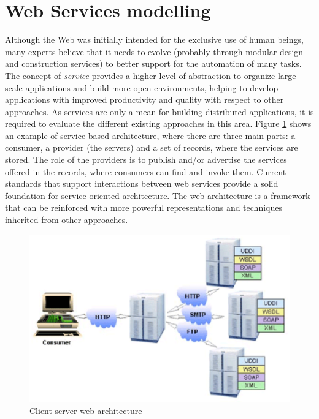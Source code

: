  
\section{Web Services modelling}

Although the Web was initially intended for the exclusive use of human beings, 
many experts believe that it needs to evolve (probably through modular design 
and construction services) to better support for the automation of many tasks. 
The concept of \emph{service} provides a higher level of abstraction to organize 
large-scale applications and build more open environments, helping to develop 
applications with improved productivity and quality with respect to other approaches. 
As services are only a mean for building distributed applications, 
it is required to evaluate the different existing approaches in this area. 
Figure \ref{arch} shows an example of service-based architecture, 
where there are three main parts: a consumer, a provider (the servers) and a set of records, 
where the services are stored. The role of the providers is to publish and/or advertise the 
services offered in the records, where consumers can find and invoke them. 
Current standards that support interactions between web services provide a 
solid foundation for service-oriented architecture. 
The web architecture is a framework that can be reinforced with more 
powerful representations and techniques inherited from other approaches.

\begin{figure}
\begin{center}
  \includegraphics[width =\columnwidth]{Figures/clientserver.eps}
\end{center}
  \caption{Client-server web architecture}
  \label{arch}
\end{figure}


